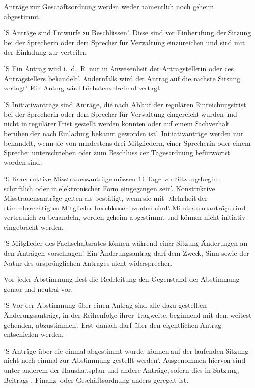 \documentclass[%
	parskip=half,
]{scrartcl}
\newcommand{\edit}[1]{{\color{red} #1}}
\begin{document}
\begin{contract}
Anträge zur Geschäftsordnung werden \edit{weder} namentlich \edit{noch} geheim abgestimmt.


'S Anträge sind Entwürfe zu Beschlüssen'. Diese sind vor Einberufung der Sitzung bei \edit{der Sprecherin oder dem 
Sprecher} für Verwaltung einzureichen und sind mit der Einladung zur verteilen.

'S Ein Antrag wird i.~d.~R. nur in Anwesenheit \edit{der Antragstellerin oder des Antragstellers} behandelt'. 
Andernfalls wird der Antrag auf die nächste Sitzung vertagt'. Ein Antrag wird höchstens dreimal vertagt.

'S Initiativanträge sind Anträge, die nach Ablauf der regulären Einreichungsfrist bei \edit{der Sprecherin oder dem 
Sprecher} für Verwaltung eingereicht wurden und nicht in regulärer Frist gestellt werden konnten oder auf einem 
Sachverhalt beruhen der nach Einladung bekannt geworden ist'. Initiativanträge werden nur behandelt, wenn sie von 
mindestens drei Mitgliedern, \edit{einer Sprecherin oder einem Sprecher} unterschrieben oder zum Beschluss der 
Tagesordnung befürwortet worden sind.

'S Konstruktive Misstrauensanträge müssen 10 Tage vor Sitzungsbeginn schriftlich oder in elektronischer Form 
eingegangen sein'. Konstruktive Misstrauensanträge gelten als bestätigt, wenn sie mit -Mehrheit der 
stimmberechtigten Mitglieder beschlossen worden sind'. Misstrauensanträge sind vertraulich zu behandeln, werden geheim 
abgestimmt und können nicht initiativ eingebracht werden.

'S Mitglieder des Fachschaftsrates können während einer Sitzung Änderungen an den Anträgen vorschlagen'. Ein 
Änderungsantrag darf dem Zweck, Sinn sowie der Natur des ursprünglichen Antrages nicht widersprechen.


Vor jeder Abstimmung liest die \edit{Redeleitung} den Gegenstand der Abstimmung genau und neutral vor.

'S Vor der Abstimmung über einen Antrag sind alle dazu gestellten Änderungsanträge, in der Reihenfolge ihrer Tragweite, 
beginnend mit dem weitest gehenden, abzustimmen'. Erst danach darf über den \edit{eigentlichen Antrag} entschieden 
werden.

'S Anträge über die einmal abgestimmt wurde, können auf der laufenden Sitzung nicht noch einmal zur Abstimmung gestellt 
werden'. Ausgenommen hiervon sind unter anderem der Haushaltsplan und andere Anträge, sofern dies in Satzung, 
Beitrags-, Finanz- oder Geschäftsordnung anders geregelt ist.

\end{contract}
\end{document}
